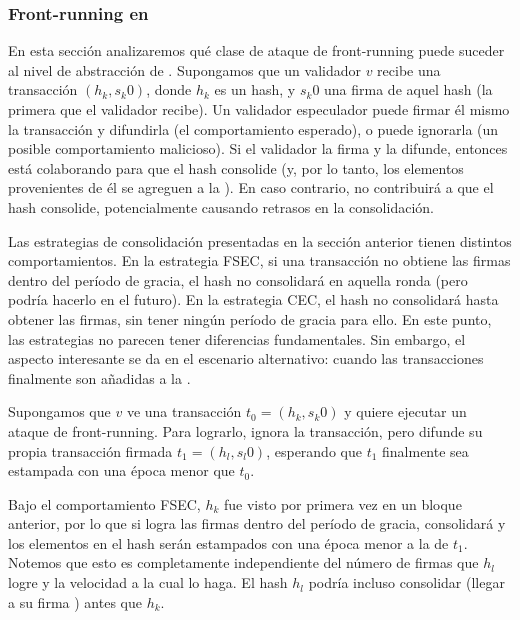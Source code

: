 \subsubsection{Front-running en \hashchain}
En esta sección analizaremos qué clase de ataque de front-running puede suceder al nivel de abstracción de \hashchain.
Supongamos que un validador $v$ recibe una transacción $(h_k, s_{k}0)$, donde $h_k$ es un hash,
y $s_{k}0$ una firma de aquel hash (la primera que el validador recibe).
Un validador especulador puede firmar él mismo la
transacción y difundirla (el comportamiento esperado), o puede ignorarla (un posible comportamiento
malicioso). Si el validador la firma y la difunde, entonces está colaborando para que el hash
consolide (y, por lo tanto, los elementos provenientes de él se agreguen a la  \setchain).
En caso contrario, no contribuirá a que el hash consolide, potencialmente causando retrasos
en la consolidación.
%

%
Las estrategias de consolidación presentadas en la sección anterior tienen distintos comportamientos.
En la estrategia FSEC, si una transacción no obtiene las \SPH firmas
dentro del período de gracia, el hash no consolidará en aquella ronda (pero podría hacerlo
en el futuro).
%
En la estrategia CEC, el hash no consolidará hasta obtener las \SPH firmas,
sin tener ningún período de gracia para ello.
%
En este punto, las estrategias no parecen tener diferencias fundamentales. Sin embargo, el aspecto
interesante se da en el escenario alternativo: cuando las transacciones finalmente son añadidas a la
\setchain.
%

Supongamos que $v$ ve una transacción $t_0 = (h_k, s_{k}0)$ y quiere ejecutar un ataque de front-running.
Para lograrlo, ignora la transacción, pero difunde su propia transacción firmada $t_1 = (h_l, s_{l}0)$,
esperando que $t_1$ finalmente sea estampada con una época menor que $t_0$.
%

Bajo el comportamiento FSEC, $h_k$ fue visto por primera vez en un bloque anterior,
por lo que si logra las
\SPH firmas dentro del período de gracia, consolidará y los elementos
en el hash serán estampados con una época menor a la de $t_1$.
%
Notemos que esto es completamente independiente del número de firmas que $h_l$ logre y la velocidad
a la cual lo haga. El hash $h_l$ podría incluso consolidar (llegar a su firma \SPH)
antes que $h_k$.
%

